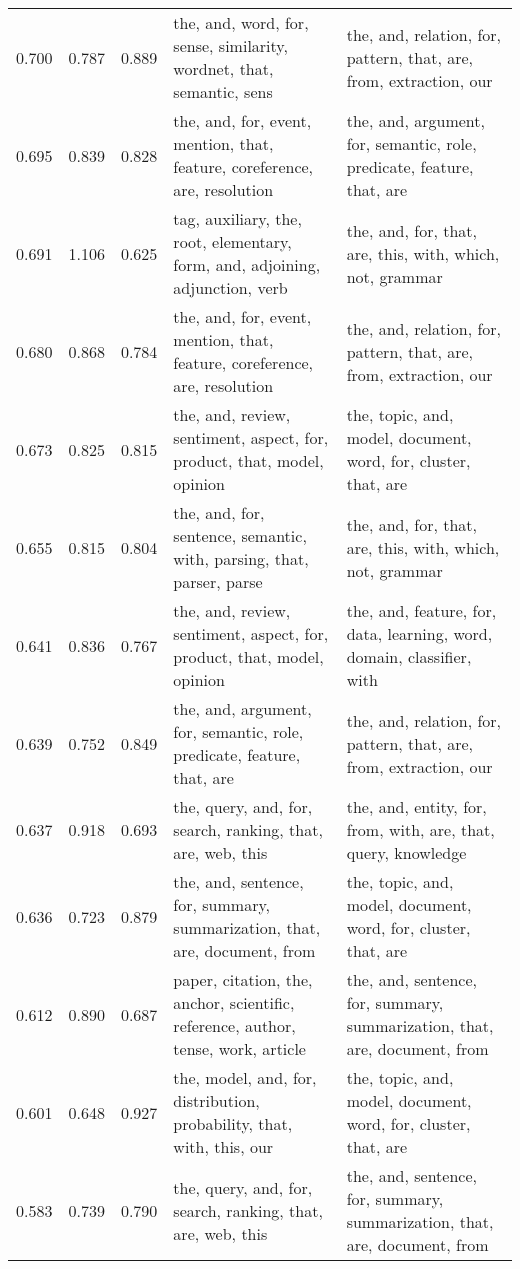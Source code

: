 \begin{tabular}{cccp{5cm}p{5cm}}
0.700 & 0.787 & 0.889 & the, and, word, for, sense, similarity, wordnet, that, semantic, sens & the, and, relation, for, pattern, that, are, from, extraction, our \\
0.695 & 0.839 & 0.828 & the, and, for, event, mention, that, feature, coreference, are, resolution & the, and, argument, for, semantic, role, predicate, feature, that, are \\
0.691 & 1.106 & 0.625 & tag, auxiliary, the, root, elementary, form, and, adjoining, adjunction, verb & the, and, for, that, are, this, with, which, not, grammar \\
0.680 & 0.868 & 0.784 & the, and, for, event, mention, that, feature, coreference, are, resolution & the, and, relation, for, pattern, that, are, from, extraction, our \\
0.673 & 0.825 & 0.815 & the, and, review, sentiment, aspect, for, product, that, model, opinion & the, topic, and, model, document, word, for, cluster, that, are \\
0.655 & 0.815 & 0.804 & the, and, for, sentence, semantic, with, parsing, that, parser, parse & the, and, for, that, are, this, with, which, not, grammar \\
0.641 & 0.836 & 0.767 & the, and, review, sentiment, aspect, for, product, that, model, opinion & the, and, feature, for, data, learning, word, domain, classifier, with \\
0.639 & 0.752 & 0.849 & the, and, argument, for, semantic, role, predicate, feature, that, are & the, and, relation, for, pattern, that, are, from, extraction, our \\
0.637 & 0.918 & 0.693 & the, query, and, for, search, ranking, that, are, web, this & the, and, entity, for, from, with, are, that, query, knowledge \\
0.636 & 0.723 & 0.879 & the, and, sentence, for, summary, summarization, that, are, document, from & the, topic, and, model, document, word, for, cluster, that, are \\
0.612 & 0.890 & 0.687 & paper, citation, the, anchor, scientific, reference, author, tense, work, article & the, and, sentence, for, summary, summarization, that, are, document, from \\
0.601 & 0.648 & 0.927 & the, model, and, for, distribution, probability, that, with, this, our & the, topic, and, model, document, word, for, cluster, that, are \\
0.583 & 0.739 & 0.790 & the, query, and, for, search, ranking, that, are, web, this & the, and, sentence, for, summary, summarization, that, are, document, from \\

\end{tabular}
